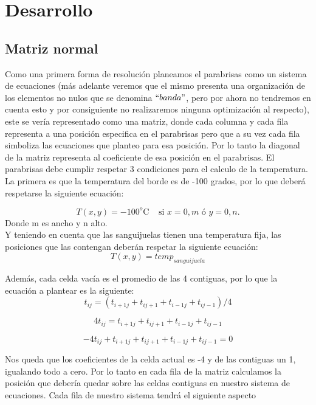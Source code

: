 \section{Desarrollo}

\subsection{Matriz normal}

Como una primera forma de resolución planeamos el parabrisas como un sistema de ecuaciones (más adelante veremos que el mismo presenta una organización de los elementos no nulos que se denomina $``banda"$, pero por ahora no tendremos en cuenta esto y por consiguiente no realizaremos ninguna optimización al respecto), este se vería representado como una matriz, donde cada columna y cada fila representa a una posición especifica en el parabrisas pero que a su vez cada fila simboliza las ecuaciones que planteo para esa posición. Por lo tanto la diagonal de la matriz representa al coeficiente de esa posición en el parabrisas.
El parabrisas debe cumplir respetar 3 condiciones para el calculo de la temperatura.
La primera es que la temperatura del borde es de -100 grados, por lo que deberá respetarse la siguiente ecuación:

\begin{equation}
T(x,y) = -100^o\textrm{C}~~~~~\textrm{si } x = 0,m \textrm{ \'o } y = 0,n. 
\label{eq:borde}
\end{equation}
Donde m es ancho y n alto.\\
Y teniendo en cuenta que las sanguijuelas tienen una temperatura fija, las posiciones que las contengan deberán respetar la siguiente ecuación:
 \begin{equation}
T(x,y) = temp_{sanguijuela}
\label{eq:borde}
\end{equation}

Además, cada celda vacía es el promedio de las 4 contiguas, por lo que la ecuación a plantear es la siguiente:
\[
t_{ij} = (t_{i+1 j} + t_{i j+1} + t_{i-1 j} + t_{i j-1}) / 4
\]

\[
4 t_{ij} = t_{i+1 j} + t_{i j+1} + t_{i-1 j} + t_{i j-1}
\]

\[
 - 4 t_{ij} + t_{i+1 j} + t_{i j+1} + t_{i-1 j} + t_{i j-1}  = 0
\]

Nos queda que los coeficientes de la celda actual es -4 y de las contiguas un 1, igualando todo a cero.
Por lo tanto en cada fila de la matriz calculamos la posición que debería quedar sobre las celdas contiguas en nuestro sistema de ecuaciones.
Cada fila de nuestro sistema tendrá el siguiente aspecto

